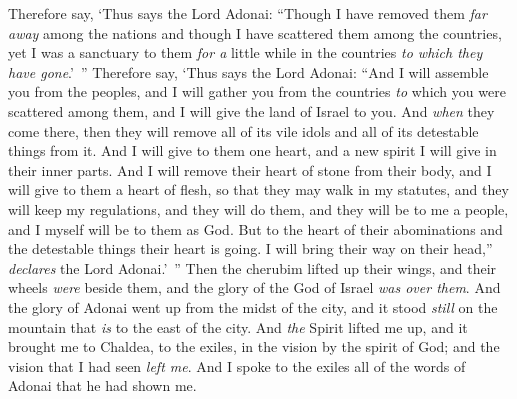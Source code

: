 \begin{biblechapter}
\verse Therefore say, ‘Thus says the Lord Adonai: “Though I have removed them \textit{far away} among the nations and though I have scattered them among the countries, yet I was a sanctuary to them \textit{for a} little while in the countries \textit{to which they have gone}.’ ”
\verse Therefore say, ‘Thus says the Lord Adonai: “And I will assemble you from the peoples, and I will gather you from the countries \textit{to} which you were scattered among them, and I will give the land of Israel to you.
\verse And \textit{when} they come there, then they will remove all of its vile idols and all of its detestable things from it.
\verse And I will give to them one heart, and a new spirit I will give in their inner parts. And I will remove their heart of stone from their body, and I will give to them a heart of flesh,
\verse so that they may walk in my statutes, and they will keep my regulations, and they will do them, and they will be to me a people, and I myself will be to them as God.
\verse But to the heart of their abominations and the detestable things their heart is going. I will bring their way on their head,” \textit{declares} the Lord Adonai.’ ”
\verse Then the cherubim lifted up their wings, and their wheels \textit{were} beside them, and the glory of the God of Israel \textit{was over them}.
\verse And the glory of Adonai went up from the midst of the city, and it stood \textit{still} on the mountain that \textit{is} to the east of the city.
\verse And \textit{the} Spirit lifted me up, and it brought me to Chaldea, to the exiles, in the vision by the spirit of God; and the vision that I had seen \textit{left me}.
\verse And I spoke to the exiles all of the words of Adonai that he had shown me.
\end{biblechapter}

